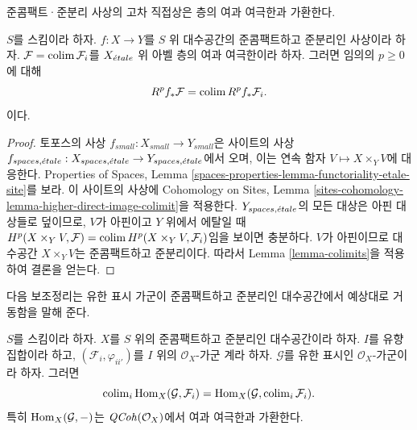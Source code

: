 \begin{lemma}
\label{lemma-colimit-cohomology}
\begin{slogan}
준콤팩트·준분리 사상의 고차 직접상은 층의 여과 여극한과 가환한다.
\end{slogan}
$S$를 스킴이라 하자. $f : X \to Y$를 $S$ 위 대수공간의
준콤팩트하고 준분리인 사상이라 하자.
$\mathcal{F} = \mathop{\mathrm{colim}}\nolimits \mathcal{F}_i$를 $X_{\acute{e}tale}$ 위 아벨 층의
여과 여극한이라 하자. 그러면 임의의 $p \geq 0$에 대해
$$
R^pf_*\mathcal{F} = \mathop{\mathrm{colim}}\nolimits R^pf_*\mathcal{F}_i.
$$
이다.
\end{lemma}

\begin{proof}
토포스의 사상 $f_{small} : X_{small} \to Y_{small}$은 사이트의 사상
$f_{spaces, {\acute{e}tale}} : X_{spaces, {\acute{e}tale}} \to Y_{spaces, {\acute{e}tale}}$에서
오며, 이는 연속 함자 $V \longmapsto X \times_Y V$에 대응한다.
Properties of Spaces, Lemma
\ref{spaces-properties-lemma-functoriality-etale-site}를 보라.
이 사이트의 사상에 Cohomology on Sites, Lemma
\ref{sites-cohomology-lemma-higher-direct-image-colimit}을 적용한다.
$Y_{spaces, {\acute{e}tale}}$의 모든 대상은 아핀 대상들로 덮이므로,
$V$가 아핀이고 $Y$ 위에서 에탈일 때
$H^p(X \times_Y V, \mathcal{F}) =
\mathop{\mathrm{colim}}\nolimits H^p(X \times_Y V, \mathcal{F}_i)$임을 보이면 충분하다.
$V$가 아핀이므로 대수공간 $X \times_Y V$는 준콤팩트하고
준분리이다. 따라서 Lemma \ref{lemma-colimits}을 적용하여 결론을 얻는다.
\end{proof}

\noindent
다음 보조정리는 유한 표시 가군이 준콤팩트하고 준분리인
대수공간에서 예상대로 거동함을 말해 준다.

\begin{lemma}
\label{lemma-finite-presentation-quasi-compact-colimit}
$S$를 스킴이라 하자. $X$를 $S$ 위의 준콤팩트하고 준분리인
대수공간이라 하자. $I$를 유향 집합이라 하고,
$(\mathcal{F}_i, \varphi_{ii'})$를 $I$ 위의
$\mathcal{O}_X$-가군 계라 하자. $\mathcal{G}$를 유한 표시인
$\mathcal{O}_X$-가군이라 하자. 그러면
$$
\mathop{\mathrm{colim}}\nolimits_i \mathop{\mathrm{Hom}}\nolimits_X(\mathcal{G}, \mathcal{F}_i)
=
\mathop{\mathrm{Hom}}\nolimits_X(\mathcal{G}, \mathop{\mathrm{colim}}\nolimits_i \mathcal{F}_i).
$$
특히 $\mathop{\mathrm{Hom}}\nolimits_X(\mathcal{G}, -)$는 $\mathit{QCoh}(\mathcal{O}_X)$에서
여과 여극한과 가환한다.
\end{lemma}

